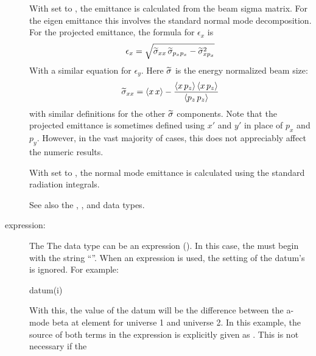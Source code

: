 \begin{description}
With  set to , the emittance is calculated
from the beam sigma matrix. For the eigen emittance this involves the
standard normal mode decomposition. For the projected emittance, the
formula for $\epsilon_x$ is
\begin{equation}
  \epsilon_x = \sqrt{ \widetilde\sigma_{xx} \, \widetilde\sigma_{p_xp_x} - \widetilde\sigma_{xp_x}^2}
\end{equation}
With a similar equation for $\epsilon_y$. Here $\widetilde\sigma$ is the energy normalized
beam size:
\begin{equation}
  \widetilde\sigma_{xx} = \langle x \, x \rangle - 
  \frac{\langle x \, p_z \rangle \, \langle x \, p_z \rangle}{\langle p_z \, p_z \rangle}
\end{equation}
with similar definitions for the other $\widetilde\sigma$ components. 
Note that the projected emittance is sometimes defined using
$x'$ and $y'$ in place of $p_x$ and $p_y$. However, in the vast
majority of cases, this does not appreciably affect the numeric
results.

With  set to , the normal mode emittance is calculated
using the standard radiation integrals.

See also the , , and
 data types.

  \item[expression:] \Newline
The  The data type can be an expression
().  In this case, the  must
begin with the string ``''.  When an expression
 is used, the setting of the datum's  is
ignored.  For example:
\begin{example}
  datum(i)%
\end{example}
With this, the value of the datum will be the difference between
the a-mode beta at element 
for universe 1 and universe 2. In this example,
the source of both terms in the expression is explicitly given as .
This is not necessary if the \vn{datum%
\begin{example}
  datum(i)%
  datum(i)%
\end{example}
An expression can also be used as the
\vn{default_data_type}. In this case, the 
evaluation point is implicit. For example:
\begin{example}
  default_data_source = "data"
  default_data_type = "expression: 1@beta.a - 2@beta.a"
\end{example}
which is equivalent to:
\begin{example}
  default_data_type = "expression: 1@data::beta.a - 2@data::beta.a"
\end{example}

}
\end{description}
